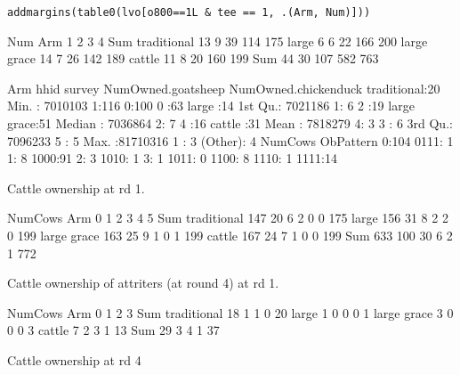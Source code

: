 \verb|addmargins(table0(lvo[o800==1L & tee == 1, .(Arm, Num)]))|
\begin{Schunk}
\begin{Soutput}
             Num
Arm             1   2   3   4 Sum
  traditional  13   9  39 114 175
  large         6   6  22 166 200
  large grace  14   7  26 142 189
  cattle       11   8  20 160 199
  Sum          44  30 107 582 763
\end{Soutput}
\begin{Soutput}
          Arm          hhid          survey  NumOwned.goatsheep NumOwned.chickenduck
 traditional:20   Min.   : 7010103   1:116   0:100              0      :63          
 large      :14   1st Qu.: 7021186           1:  6              2      :19          
 large grace:51   Median : 7036864           2:  7              4      :16          
 cattle     :31   Mean   : 7818279           4:  3              3      : 6          
                  3rd Qu.: 7096233                              5      : 5          
                  Max.   :81710316                              1      : 3          
                                                                (Other): 4          
 NumCows ObPattern
 0:104   0111: 1  
 1:  8   1000:91  
 2:  3   1010: 1  
 3:  1   1011: 0  
         1100: 8  
         1110: 1  
         1111:14  
\end{Soutput}
\end{Schunk}
Cattle ownership at rd 1.
\begin{Schunk}
\begin{Soutput}
             NumCows
Arm             0   1   2   3   4   5 Sum
  traditional 147  20   6   2   0   0 175
  large       156  31   8   2   2   0 199
  large grace 163  25   9   1   0   1 199
  cattle      167  24   7   1   0   0 199
  Sum         633 100  30   6   2   1 772
\end{Soutput}
\end{Schunk}
Cattle ownership of attriters (at round 4) at rd 1.
\begin{Schunk}
\begin{Soutput}
             NumCows
Arm            0  1  2  3 Sum
  traditional 18  1  1  0  20
  large        1  0  0  0   1
  large grace  3  0  0  0   3
  cattle       7  2  3  1  13
  Sum         29  3  4  1  37
\end{Soutput}
\end{Schunk}
Cattle ownership at rd 4 
